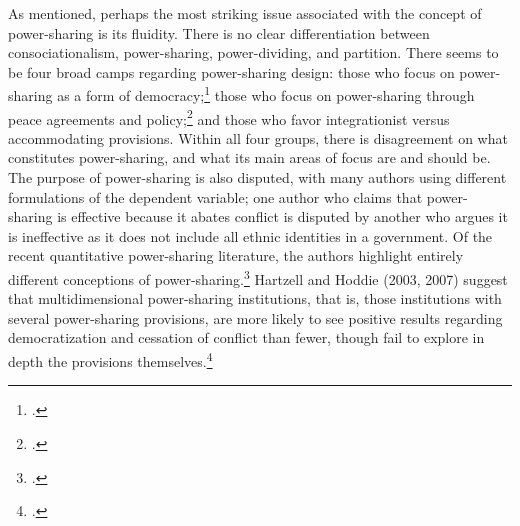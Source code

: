 \documentclass[12pt]{article}
\begin{document}
As mentioned, perhaps the most striking issue associated with the concept of power-sharing is its fluidity. There is no clear differentiation between consociationalism, power-sharing, power-dividing, and partition. There seems to be four broad camps regarding power-sharing design: those who focus on power-sharing as a form of democracy;\footcite{barry_consociational_1975, lijphart_consociational_1974, norris_evidence_2008, steiner_research_1981} those who focus on power-sharing through peace agreements and policy;\footcite{hartzell_institutionalizing_2003, hartzell_crafting_2007, mukherjee_why_2006} and those who favor integrationist versus accommodating provisions. Within all four groups, there is disagreement on what constitutes power-sharing, and what its main areas of focus are and should be. The purpose of power-sharing is also disputed, with many authors using different formulations of the dependent variable; one author who claims that power-sharing is effective because it abates conflict is disputed by another who argues it is ineffective as it does not include all ethnic identities in a government. Of the recent quantitative power-sharing literature, the authors highlight entirely different conceptions of power-sharing.\footcite{hartzell_institutionalizing_2003, hartzell_crafting_2007, graham_safeguarding_2017, jarstad_words_2008, mattes_fostering_2009, strom_inclusion_2017, walter_committing_2002} Hartzell and Hoddie (2003, 2007) suggest that multidimensional power-sharing institutions, that is, those institutions with several power-sharing provisions, are more likely to see positive results regarding democratization and cessation of conflict than fewer, though fail to explore in depth the provisions themselves.\footcite[325-32]{hartzell_institutionalizing_2003}
\end{document}
